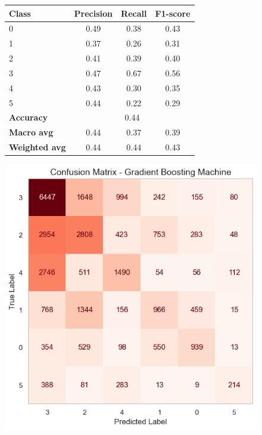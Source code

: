 \begin{figure}[ht]
    \centering
    \begin{minipage}{0.45\textwidth} 
    \centering
    \label{tab:GBM_report_r}
    \small 
    \begin{tabular}{lccc}
    \hline
    \textbf{Class} & \textbf{Precision} & \textbf{Recall} & \textbf{F1-score}\\
    \hline
    0  & 0.49 & 0.38 & 0.43  \\
    1      & 0.37 & 0.26 & 0.31  \\
    2      & 0.41 & 0.39 & 0.40  \\
    3   & 0.47 & 0.67 & 0.56  \\
    4      & 0.43 & 0.30 & 0.35  \\
    5  & 0.44 & 0.22 & 0.29  \\
    \hline
    \textbf{Accuracy}    & \multicolumn{3}{c}{0.44} \\
    \textbf{Macro avg}   & 0.44 & 0.37 & 0.39  \\
    \textbf{Weighted avg}& 0.44 & 0.44 & 0.43  \\
    \hline
    \end{tabular}
    \end{minipage}
    \hfill
    \begin{minipage}{0.4\textwidth} 
    \centering
    \includegraphics[width=\textwidth]{plotsss/GBM_confusion_rating.png} 

\end{minipage}
\end{figure}
